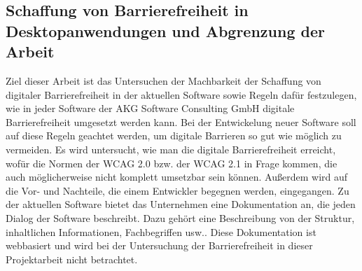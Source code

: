\subsection{Schaffung von Barrierefreiheit in Desktopanwendungen und Abgrenzung der Arbeit}
\label{subsec: Schaffung von Barrierefreiheit in Desktopanwendungen und Abgrenzung der Arbeit}

Ziel dieser Arbeit ist das Untersuchen der Machbarkeit der Schaffung von digitaler Barrierefreiheit in der aktuellen Software sowie Regeln dafür festzulegen, wie in jeder Software der AKG Software Consulting GmbH digitale Barrierefreiheit umgesetzt werden kann. Bei der Entwickelung neuer Software soll auf diese Regeln geachtet werden, um digitale Barrieren so gut wie möglich zu vermeiden. Es wird untersucht, wie man die digitale Barrierefreiheit erreicht, wofür die Normen der \ac{WCAG} 2.0 bzw. der \ac{WCAG} 2.1 in Frage kommen, die auch möglicherweise nicht komplett umsetzbar sein können. Außerdem wird auf die Vor- und Nachteile, die einem Entwickler begegnen werden, eingegangen. Zu der aktuellen Software bietet das Unternehmen eine Dokumentation an, die jeden Dialog der Software beschreibt. Dazu gehört eine Beschreibung von der Struktur, inhaltlichen Informationen, Fachbegriffen usw.. Diese Dokumentation ist webbasiert und wird bei der Untersuchung der Barrierefreiheit in dieser Projektarbeit nicht betrachtet.